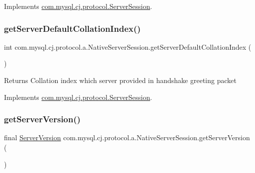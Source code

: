 Implements \mbox{\hyperlink{interfacecom_1_1mysql_1_1cj_1_1protocol_1_1_server_session_afeb928036af67a7fff2d45783673c72d}{com.\+mysql.\+cj.\+protocol.\+Server\+Session}}.

\mbox{\label{classcom_1_1mysql_1_1cj_1_1protocol_1_1a_1_1_native_server_session_aeaccfa02aeae2a872f2d92412a051de0}} 
\subsubsection{\texorpdfstring{get\+Server\+Default\+Collation\+Index()}{getServerDefaultCollationIndex()}}
{\footnotesize\ttfamily int com.\+mysql.\+cj.\+protocol.\+a.\+Native\+Server\+Session.\+get\+Server\+Default\+Collation\+Index (\begin{DoxyParamCaption}{ }\end{DoxyParamCaption})}

\begin{DoxyReturn}{Returns}
Collation index which server provided in handshake greeting packet 
\end{DoxyReturn}


Implements \mbox{\hyperlink{interfacecom_1_1mysql_1_1cj_1_1protocol_1_1_server_session_a840bf74b75252459afd6b33ae21c8379}{com.\+mysql.\+cj.\+protocol.\+Server\+Session}}.

\mbox{\label{classcom_1_1mysql_1_1cj_1_1protocol_1_1a_1_1_native_server_session_a38d2e0173e10f1f3b55a04c34c9fa8e8}} 
\subsubsection{\texorpdfstring{get\+Server\+Version()}{getServerVersion()}}
{\footnotesize\ttfamily final \mbox{\hyperlink{classcom_1_1mysql_1_1cj_1_1_server_version}{Server\+Version}} com.\+mysql.\+cj.\+protocol.\+a.\+Native\+Server\+Session.\+get\+Server\+Version (\begin{DoxyParamCaption}{ }\end{DoxyParamCaption})}

